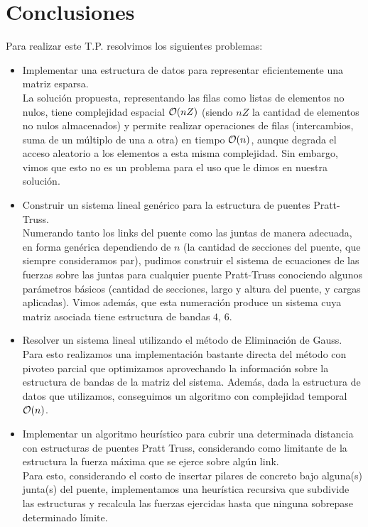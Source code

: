 \section{Conclusiones}
Para realizar este T.P. resolvimos los siguientes problemas:
\begin{itemize}
	\item Implementar una estructura de datos para representar eficientemente una matriz esparsa.\\
	La solución propuesta, representando las filas como listas de elementos no nulos, tiene complejidad espacial $\mathcal{O}(nZ)$ (siendo $nZ$ la cantidad de elementos no nulos almacenados) y permite realizar operaciones de filas (intercambios, suma de un múltiplo de una a otra) en tiempo $\mathcal{O}(n)$, aunque degrada el acceso aleatorio a los elementos a esta misma complejidad. Sin embargo, vimos que esto no es un problema para el uso que le dimos en nuestra solución.
	\item Construir un sistema lineal genérico para la estructura de puentes Pratt-Truss.\\
	Numerando tanto los links del puente como las juntas de manera adecuada, en forma genérica dependiendo de $n$ (la cantidad de secciones del puente, que siempre consideramos par), pudimos construir el sistema de ecuaciones de las fuerzas sobre las juntas para cualquier puente Pratt-Truss conociendo algunos parámetros básicos (cantidad de secciones, largo y altura del puente, y cargas aplicadas). Vimos además, que esta numeración produce un sistema cuya matriz asociada tiene estructura de bandas $4$, $6$.
	\item Resolver un sistema lineal utilizando el método de Eliminación de Gauss. \\
	 Para esto realizamos una implementación bastante directa del método con pivoteo parcial que optimizamos aprovechando la información sobre la estructura de bandas de la matriz del sistema. Además, dada la estructura de datos que utilizamos, conseguimos un algoritmo con complejidad temporal $\mathcal{O}(n)$.
	 \item Implementar un algoritmo heurístico para cubrir una determinada distancia con estructuras de puentes Pratt Truss, considerando como limitante de la estructura la fuerza máxima que se ejerce sobre algún link.\\
	 Para esto, considerando el costo de insertar pilares de concreto bajo alguna(s) junta(s) del puente, implementamos una heurística recursiva que subdivide las estructuras y recalcula las fuerzas ejercidas hasta que ninguna sobrepase determinado límite.
\end{itemize} 

